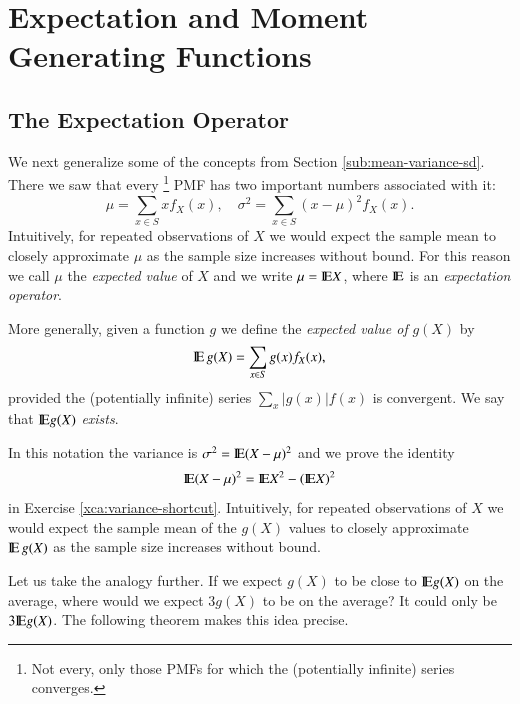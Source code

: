 \documentclass[captions=tableheading]{scrbook}
\begin{document}
\section{Expectation and Moment Generating Functions}
\label{sec-5-4}

\label{sec:expectation-and-mgfs}
\subsection{The Expectation Operator}
\label{sec-5-4-1}

\label{sub:expectation-operator}

We next generalize some of the concepts from Section \ref{sub:mean-variance-sd}. There we saw that every
\footnote{Not every, only those PMFs for which the (potentially infinite) series converges.}
PMF has two important numbers associated with it:
\begin{equation}
\mu=\sum_{x\in S}xf_{X}(x),\quad\sigma^{2}=\sum_{x\in S}(x-\mu)^{2}f_{X}(x).
\end{equation}
Intuitively, for repeated observations of \(X\) we would expect the sample mean to closely approximate \(\mu\) as the sample size increases without bound. For this reason we call \(\mu\) the \emph{expected value} of \(X\) and we write \(\mu=\mathrm{I\hspace{-1.5pt}E} X\), where \(\mathrm{I\hspace{-1.5pt}E}\) is an \emph{expectation operator}.

\begin{defn}
More generally, given a function \(g\) we define the \emph{expected value of} \(g(X)\) by
\begin{equation}
\mathrm{I\hspace{-1.5pt}E}\, g(X)=\sum_{x\in S}g(x)f_{X}(x),
\end{equation}
provided the (potentially infinite) series \(\sum_{x}|g(x)|f(x)\) is convergent. We say that \(\mathrm{I\hspace{-1.5pt}E} g(X)\) \emph{exists}.
\end{defn}

In this notation the variance is \(\sigma^{2}=\mathrm{I\hspace{-1.5pt}E}(X-\mu)^{2}\) and we prove the identity
\begin{equation}
\mathrm{I\hspace{-1.5pt}E}(X-\mu)^{2}=\mathrm{I\hspace{-1.5pt}E} X^{2}-(\mathrm{I\hspace{-1.5pt}E} X)^{2}
\end{equation}
in Exercise \ref{xca:variance-shortcut}. Intuitively, for repeated observations of \(X\) we would expect the sample mean of the \(g(X)\) values to closely approximate \(\mathrm{I\hspace{-1.5pt}E}\, g(X)\) as the sample size increases without bound.

Let us take the analogy further. If we expect \(g(X)\) to be close to \(\mathrm{I\hspace{-1.5pt}E} g(X)\) on the average, where would we expect \(3g(X)\) to be on the average? It could only be \(3\mathrm{I\hspace{-1.5pt}E} g(X)\). The following theorem makes this idea precise.
\end{document}
